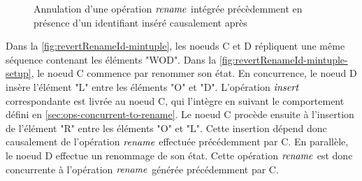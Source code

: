 \begin{figure}[!ht]
{\begin{minipage}{\linewidth}
{
        }
        \label{fig:revertRenameId-mintuple-revert}
    \end{minipage}}
  \caption{Annulation d'une opération $\mathit{rename}$ intégrée précèdemment en présence d'un identifiant inséré causalement après}
  \label{fig:revertRenameId-mintuple}
\end{figure}

Dans la \autoref{fig:revertRenameId-mintuple}, les noeuds C et D répliquent une même séquence contenant les éléments "WOD".
Dans la \autoref{fig:revertRenameId-mintuple-setup}, le noeud C commence par renommer son état.
En concurrence, le noeud D insère l'élément "L" entre les éléments "O" et "D".
L'opération $\mathit{insert}$ correspondante est livrée au noeud C, qui l'intègre en suivant le comportement défini en \autoref{sec:ops-concurrent-to-rename}.
Le noeud C procède ensuite à l'insertion de l'élément "R" entre les éléments "O" et "L".
Cette insertion dépend donc causalement de l'opération $\mathit{rename}$ effectuée précédemment par C.
En parallèle, le noeud D effectue un renommage de son état.
Cette opération $\mathit{rename}$ est donc concurrente à l'opération $\mathit{rename}$ générée précédemment par C.

